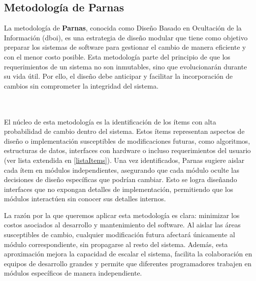 \subsection{Metodología de Parnas}
\label{metoParnas}

La metodología de \textbf{Parnas}\cite{Parnas1972}, conocida como Diseño Basado en Ocultación de la Información (\gls{dboi}), es una estrategia de diseño modular que tiene como objetivo preparar los sistemas de software para gestionar el cambio de manera eficiente y con el menor costo posible. Esta metodología parte del principio de que los requerimientos de un sistema no son inmutables, sino que evolucionarán durante su vida útil. Por ello, el diseño debe anticipar y facilitar la incorporación de cambios sin comprometer la integridad del sistema.

\noindent{} 
\\\\
\indent
El núcleo de esta metodología es la identificación de los ítems con alta probabilidad de cambio dentro del sistema. Estos ítems representan aspectos de diseño o implementación susceptibles de modificaciones futuras, como algoritmos, estructuras de datos, interfaces con hardware o incluso requerimientos del usuario (ver lista extendida en \ref{listaItems}). Una vez identificados, Parnas sugiere aislar cada ítem en módulos independientes, asegurando que cada módulo oculte las decisiones de diseño específicas que podrían cambiar. Esto se logra diseñando interfaces que no expongan detalles de implementación, permitiendo que los módulos interactúen sin conocer sus detalles internos.

La razón por la que queremos aplicar esta metodología es clara: minimizar los costos asociados al desarrollo y mantenimiento del software. Al aislar las áreas susceptibles de cambio, cualquier modificación futura afectará únicamente al módulo correspondiente, sin propagarse al resto del sistema. Además, esta aproximación mejora la capacidad de escalar el sistema, facilita la colaboración en equipos de desarrollo grandes y permite que diferentes programadores trabajen en módulos específicos de manera independiente.

